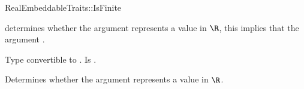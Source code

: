 \begin{ccRefConcept}{RealEmbeddableTraits::IsFinite}

\ccDefinition

 determines whether the argument represents 
a value in $\R$, this implies that the argument .

\ccRefines 



\ccTypes
{} 
        { Type convertible to .}
        { Is .}

\ccOperations
{}

        { Determines whether the argument represents a value in $\R$. }


\ccSeeAlso

\\

\end{ccRefConcept} 
